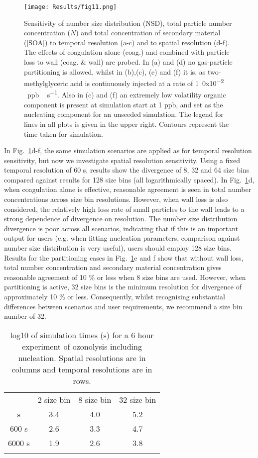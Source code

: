 \documentclass[gmd, manuscript]{copernicus}
\begin{document}
\begin{figure}[t]
\texttt{[image: Results/fig11.png]}
\caption{Sensitivity of number size distribution (NSD), total particle number concentration ($N$) and total concentration of secondary material ([SOA]) to temporal resolution (a-c) and to spatial resolution (d-f).  The effects of coagulation alone (coag.) and combined with particle loss to wall (coag. \& wall) are probed.  In (a) and (d) no gas-particle partitioning is allowed, whilst in (b),(c), (e) and (f) it is, as two-methylglyceric acid is continuously injected at a rate of \unit{1.0x10^{-2}\, ppb \, s^{-1}}.  Also in (c) and (f) an extremely low volatility organic component is present at simulation start at 1 \unit{ppb}, and set as the nucleating component for an unseeded simulation.  The legend for lines in all plots is given in the upper right.  Contours represent the time taken for simulation.}
\label{fig:tr_tests_plot}
\end{figure}

In Fig.~\ref{fig:tr_tests_plot}d-f, the same simulation scenarios are applied as for temporal resolution sensitivity, but now we investigate spatial resolution sensitivity.  Using a fixed temporal resolution of 60 s, results show the divergence of 8, 32 and 64 size bins compared against results for 128 size bins (all logarithmically spaced).  In Fig.~\ref{fig:tr_tests_plot}d, when coagulation alone is effective, reasonable agreement is seen in total number concentrations across size bin resolutions.  However, when wall loss is also considered, the relatively high loss rate of small particles to the wall leads to a strong dependence of divergence on resolution.  The number size distribution divergence is poor across all scenarios, indicating that if this is an important output for users (e.g. when fitting nucleation parameters, comparison against number size distribution is very useful), users should employ 128 size bins.  Results for the partitioning cases in Fig.~\ref{fig:tr_tests_plot}e and f show that without wall loss, total number concentration and secondary material concentration gives reasonable agreement of 10 \% or less when 8 size bins are used.  However, when partitioning is active, 32 size bins is the minimum resolution for divergence of approximately 10 \% or less.  Consequently, whilst recognising substantial differences between scenarios and user requirements, we recommend a size bin number of 32.

\begin{table*}[t]
\caption{log10 of simulation times (s) for a 6 hour experiment of  ozonolysis including nucleation.  Spatial resolutions are in columns and temporal resolutions are in rows.}
\begin{tabular}{c c c c}
\tophline
  & 2 size bin & 8 size bin & 32 size bin \\
\middlehline
60 s & 3.4 & 4.0 & 5.2 \\
600 s & 2.6 & 3.3 & 4.7 \\
6000 s & 1.9 & 2.6 & 3.8 \\
\bottomhline
\end{tabular}
\belowtable{} %
\label{tab:sim_times}
\end{table*}
\end{document}
